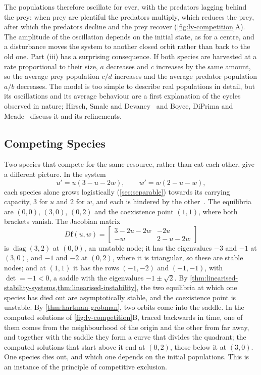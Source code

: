 The populations therefore oscillate for ever, with the predators lagging behind the prey: when prey are plentiful the predators multiply, which reduces the prey, after which the predators decline and the prey recover (\cref{fig:lv-competition}A). The amplitude of the oscillation depends on the initial state, as for a centre, and a disturbance moves the system to another closed orbit rather than back to the old one. Part (iii) has a surprising consequence. If both species are harvested at a rate proportional to their size, $a$ decreases and $c$ increases by the same amount, so the average prey population $c/d$ increases and the average predator population $a/b$ decreases. The model is too simple to describe real populations in detail, but its oscillations and its average behaviour are a first explanation of the cycles observed in nature; Hirsch, Smale and Devaney~\cite{hirsch2013} and Boyce, DiPrima and Meade~\cite[Chap.~9]{boyce2017} discuss it and its refinements.

\subsection{Competing Species}

Two species that compete for the same resource, rather than eat each other, give a different picture. In the system
\begin{equation}
u'=u(3-u-2w),\qquad w'=w(2-u-w),
\label{eq:competition}
\end{equation}
each species alone grows logistically (\cref{sec:separable}) towards its carrying capacity, $3$ for $u$ and $2$ for $w$, and each is hindered by the other~\cite[Sect.~6.4]{strogatz2015}. The equilibria are $(0,0)$, $(3,0)$, $(0,2)$ and the coexistence point $(1,1)$, where both brackets vanish. The Jacobian matrix
\[
D\mathbf f(u,w)=\begin{bmatrix}3-2u-2w&-2u\\-w&2-u-2w\end{bmatrix}
\]
is $\operatorname{diag}(3,2)$ at $(0,0)$, an unstable node; it has the eigenvalues $-3$ and $-1$ at $(3,0)$, and $-1$ and $-2$ at $(0,2)$, where it is triangular, so these are stable nodes; and at $(1,1)$ it has the rows $(-1,-2)$ and $(-1,-1)$, with $\det=-1<0$, a saddle with the eigenvalues $-1\pm\sqrt2$. By \cref{thm:linearised-stability-systems,thm:linearised-instability}, the two equilibria at which one species has died out are asymptotically stable, and the coexistence point is unstable. By \cref{thm:hartman-grobman}, two orbits come into the saddle. In the computed solutions of \cref{fig:lv-competition}B, traced backwards in time, one of them comes from the neighbourhood of the origin and the other from far away, and together with the saddle they form a curve that divides the quadrant; the computed solutions that start above it end at $(0,2)$, those below it at $(3,0)$. One species dies out, and which one depends on the initial populations. This is an instance of the principle of competitive exclusion.

